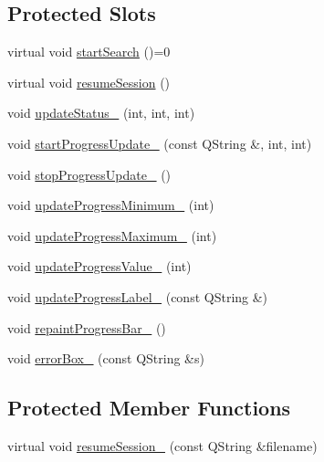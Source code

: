 \subsection*{Protected Slots}
\begin{DoxyCompactItemize}
\item 
virtual void \hyperlink{classGlobalSearch_1_1AbstractDialog_a40b7d250a73097f76edb2d77fce5482e}{start\+Search} ()=0
\item 
virtual void \hyperlink{classGlobalSearch_1_1AbstractDialog_a503a264e1a67559ace47d15d2c3aa61b}{resume\+Session} ()
\item 
void \hyperlink{classGlobalSearch_1_1AbstractDialog_ae5276198173f5a0da4a64adedc46f676}{update\+Status\+\_\+} (int, int, int)
\item 
void \hyperlink{classGlobalSearch_1_1AbstractDialog_a5370d90758c991200a233a78a1a51d16}{start\+Progress\+Update\+\_\+} (const Q\+String \&, int, int)
\item 
void \hyperlink{classGlobalSearch_1_1AbstractDialog_a5dd0aa68a9c1445965b9900290d4a507}{stop\+Progress\+Update\+\_\+} ()
\item 
void \hyperlink{classGlobalSearch_1_1AbstractDialog_a9013ffdb7bcec2ce4e6fec13fb0f1c0a}{update\+Progress\+Minimum\+\_\+} (int)
\item 
void \hyperlink{classGlobalSearch_1_1AbstractDialog_aa346e6c775c7edc9e423134ef8842c7b}{update\+Progress\+Maximum\+\_\+} (int)
\item 
void \hyperlink{classGlobalSearch_1_1AbstractDialog_af4c90078d59537ef9b9f7d69cbdc09c2}{update\+Progress\+Value\+\_\+} (int)
\item 
void \hyperlink{classGlobalSearch_1_1AbstractDialog_aff9811ebc7606ac13ae33b6130697fa9}{update\+Progress\+Label\+\_\+} (const Q\+String \&)
\item 
void \hyperlink{classGlobalSearch_1_1AbstractDialog_a455ad76e725fe59cd6f260d2c90d7a6d}{repaint\+Progress\+Bar\+\_\+} ()
\item 
void \hyperlink{classGlobalSearch_1_1AbstractDialog_a4ccf7b6a73663c780f82c2c6f4a39536}{error\+Box\+\_\+} (const Q\+String \&s)
\end{DoxyCompactItemize}
\subsection*{Protected Member Functions}
\begin{DoxyCompactItemize}
\item 
virtual void \hyperlink{classGlobalSearch_1_1AbstractDialog_a4ef7df380968131422757b20889d37b0}{resume\+Session\+\_\+} (const Q\+String \&filename)
\end{DoxyCompactItemize}
